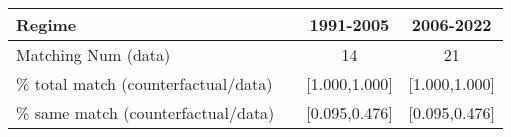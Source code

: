 
\begin{tabular}[t]{lccc}
\toprule
Regime &  & 1991-2005 & 2006-2022\\
\midrule
Matching Num (data) &  & 14 & 21\\
\% total match (counterfactual/data) &  & {}[1.000,1.000] & {}[1.000,1.000]\\
\% same match (counterfactual/data) &  & {}[0.095,0.476] & {}[0.095,0.476]\\
\bottomrule
\end{tabular}
